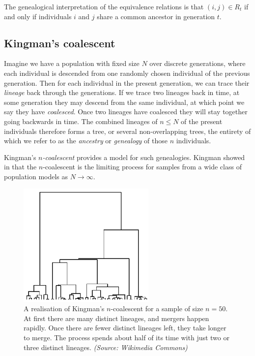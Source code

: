 \documentclass[fleqn]{article}
\theoremstyle{definition}
\begin{document}
The genealogical interpretation of the equivalence relations is that $(i,j) \in R_t$ if and only if individuals $i$ and $j$ share a common ancestor in generation $t$.

\subsection{Kingman's coalescent}
Imagine we have a population with fixed size $N$ over discrete generations, where each individual is descended from one randomly chosen individual of the previous generation. Then for each individual in the present generation, we can trace their \emph{lineage} back through the generations. 
If we trace two lineages back in time, at some generation they may descend from the same individual, at which point we say they have \emph{coalesced}. Once two lineages have coalesced they will stay together going backwards in time.
The combined lineages of $n\leq N$ of the present individuals therefore forms a tree, or several non-overlapping trees, the entirety of which we refer to as the \emph{ancestry} or \emph{genealogy} of those $n$ individuals.

Kingman's \emph{$n$-coalescent} provides a model for such genealogies. Kingman showed in \citep{kingman1982gene, kingman1982coal, kingman1982exch} that  the $n$-coalescent is the limiting process for samples from a wide class of population models as $N\to\infty$.

\begin{figure}
\centering
\includegraphics[width=0.6\textwidth]{kingman.png}
\caption{A realisation of Kingman's $n$-coalescent for a sample of size $n=50$. At first there are many distinct lineages, and mergers happen rapidly. Once there are fewer distinct lineages left, they take longer to merge. The process spends about half of its time with just two or three distinct lineages. \textit{(Source: Wikimedia Commons)}}
\label{fig:kingman}
\end{figure}
\end{document}

